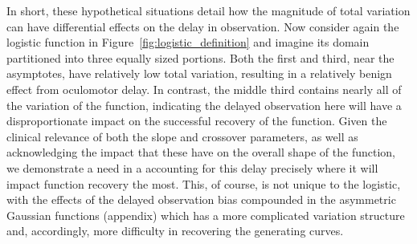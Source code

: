 \documentclass{article}
\begin{document}
In short, these hypothetical situations detail how the magnitude of total variation can have differential effects on the delay in observation. Now consider again the logistic function in Figure~\ref{fig:logistic_definition} and imagine its domain partitioned into three equally sized portions. Both the first and third, near the asymptotes, have relatively low total variation, resulting in a relatively benign effect from oculomotor delay. In contrast, the middle third contains nearly all of the variation of the function, indicating the delayed observation here will have a disproportionate impact on the successful recovery of the function. Given the clinical relevance of  both the slope and crossover parameters, as well as acknowledging the impact that these have on the overall shape of the function, we demonstrate a need in a accounting for this delay precisely where it will impact function recovery the most. This, of course, is not unique to the logistic, with the effects of the delayed observation bias compounded in the asymmetric Gaussian functions (appendix) which has a more complicated variation structure and, accordingly, more difficulty in recovering the generating curves.



\end{document}
